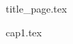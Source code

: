 \documentclass[11pt]{article}
\begin{document}
\frontmatter
{title_page.tex}
\setcounter{tocdepth}{2} %

\tableofcontents


\mainmatter

{cap1.tex}

\end{document}
